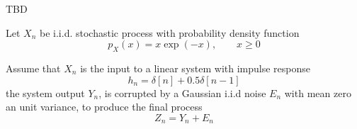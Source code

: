 \ifspanish

TBD

\else

Let $X_n$ be i.i.d. stochastic process with probability density function
\[
p_{X}(x) = x \exp(-x), \qquad x \ge 0
\]

Assume that $X_n$ is the input to a linear system with impulse response
\[
h_n = \delta[n] + 0.5 \delta[n-1]
\]
the system output $Y_n$, is corrupted by a Gaussian i.i.d noise $E_n$ with mean zero an unit variance,  to produce the final process
\[
Z_n =  Y_n + E_n
\]


